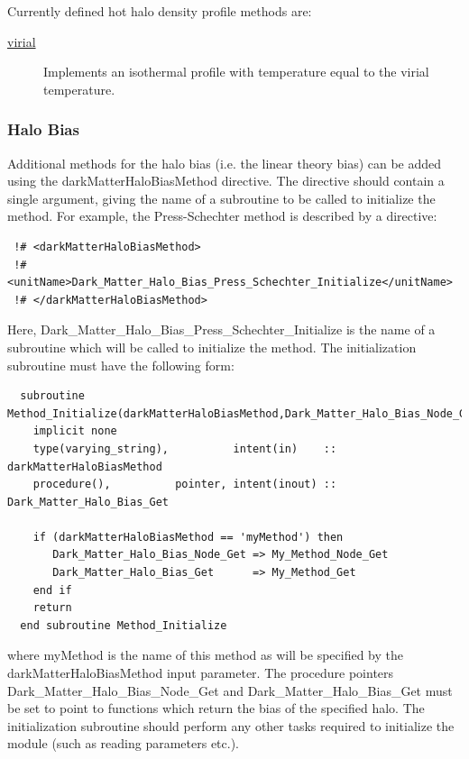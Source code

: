 Currently defined hot halo density profile methods are:
\begin{description}
 \item [\hyperlink{hot_halo.temperature_profile.virial.F90:hot_halo_temperature_profile_virial:hot_halo_temperature_virial_get}{{\normalfont \ttfamily virial}}] Implements an isothermal profile with temperature equal to the virial temperature.
\end{description}

\subsubsection{Halo Bias}

Additional methods for the halo bias (i.e. the linear theory bias) can be added using the {\normalfont \ttfamily darkMatterHaloBiasMethod} directive. The directive should contain a single argument, giving the name of a subroutine to be called to initialize the method. For example, the {\normalfont \ttfamily Press-Schechter} method is described by a directive:
\begin{verbatim}
 !# <darkMatterHaloBiasMethod>
 !#  <unitName>Dark_Matter_Halo_Bias_Press_Schechter_Initialize</unitName>
 !# </darkMatterHaloBiasMethod>
\end{verbatim}
Here, {\normalfont \ttfamily Dark\_Matter\_Halo\_Bias\_Press\_Schechter\_Initialize} is the name of a subroutine which will be called to initialize the method. The initialization subroutine must have the following form:
\begin{verbatim}
  subroutine Method_Initialize(darkMatterHaloBiasMethod,Dark_Matter_Halo_Bias_Node_Get,Dark_Matter_Halo_Bias_Get)
    implicit none
    type(varying_string),          intent(in)    :: darkMatterHaloBiasMethod
    procedure(),          pointer, intent(inout) :: Dark_Matter_Halo_Bias_Get
    
    if (darkMatterHaloBiasMethod == 'myMethod') then
       Dark_Matter_Halo_Bias_Node_Get => My_Method_Node_Get
       Dark_Matter_Halo_Bias_Get      => My_Method_Get
    end if
    return
  end subroutine Method_Initialize
\end{verbatim}
where {\normalfont \ttfamily myMethod} is the name of this method as will be specified by the {\normalfont \ttfamily darkMatterHaloBiasMethod} input parameter. The procedure pointers {\normalfont \ttfamily Dark\_Matter\_Halo\_Bias\_Node\_Get} and {\normalfont \ttfamily Dark\_Matter\_Halo\_Bias\_Get} must be set to point to functions which return the bias of the specified halo. The initialization subroutine should perform any other tasks required to initialize the module (such as reading parameters etc.).

